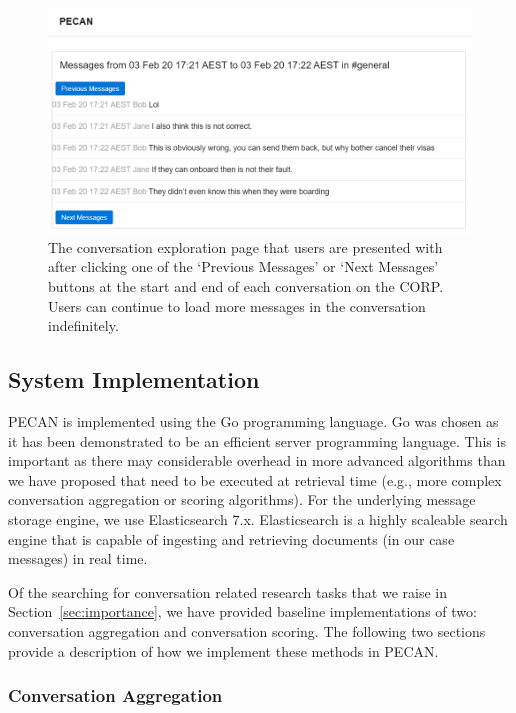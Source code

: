 \begin{figure}
	\includegraphics[width=\linewidth]{traversing}
	\caption{The conversation exploration page that users are presented with after clicking one of the `Previous Messages' or `Next Messages' buttons at the start and end of each conversation on the CORP. Users can continue to load more messages in the conversation indefinitely.}
	\label{fig:traversing}
\end{figure}


\subsection{System Implementation}

PECAN is implemented using the Go programming language. Go was chosen as it has been demonstrated to be an efficient server programming language. This is important as there may considerable overhead in more advanced algorithms than we have proposed that need to be executed at retrieval time (e.g., more complex conversation aggregation or scoring algorithms). For the underlying message storage engine, we use Elasticsearch 7.x. Elasticsearch is a highly scaleable search engine that is capable of ingesting and retrieving documents (in our case messages) in real time.

Of the searching for conversation related research tasks that we raise in Section~\ref{sec:importance}, we have provided baseline implementations of two: conversation aggregation and conversation scoring. The following two sections provide a description of how we implement these methods in PECAN. 

\subsubsection{Conversation Aggregation}
\label{sec:conv-agg}

